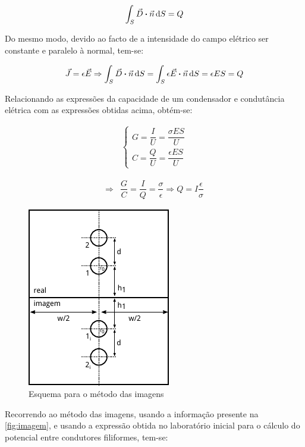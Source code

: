 \documentclass[portuguese, a4paper]{article}
\begin{document}
	\begin{align*}
			\int_S \vec{D} \vdot \vec{n} \dd{S} = Q
	\end{align*}

	\par
	Do mesmo modo, devido ao facto de a intensidade do campo elétrico ser constante e paralelo à normal, tem-se:

	\begin{align*}
		\vec{J} = \epsilon \vec{E} \Rightarrow \int_S \vec{D} \vdot \vec{n} \dd{S} = \int_S \epsilon \vec{E} \vdot \vec{n} \dd{S} = \epsilon E S = Q
	\end{align*}

	\par
	Relacionando as expressões da capacidade de um condensador e condutância elétrica com as expressões obtidas acima, obtém-se:

	\begin{align*}
		\begin{cases}
			G = \dfrac{I}{U} = \dfrac{\sigma E S}{U} \\[1em]
    	C = \dfrac{Q}{U} = \dfrac{\epsilon E S}{U}
 		\end{cases}
	\end{align*}

	\begin{align*}
		\Rightarrow &\dfrac{G}{C} = \dfrac{I}{Q} = \dfrac{\sigma}{\epsilon} \Rightarrow Q = I\dfrac{\epsilon}{\sigma}
	\end{align*}

	\begin{figure}[H]
		\centering
		\includegraphics[width=0.4\linewidth]{imagem.pdf}
		\caption{Esquema para o método das imagens}
		\label{fig:imagem}
	\end{figure}

	Recorrendo ao método das imagens, usando a informação presente na \autoref{fig:imagem}, e usando a expressão obtida no laboratório inicial para o cálculo do potencial entre condutores filiformes, tem-se:
\end{document}
